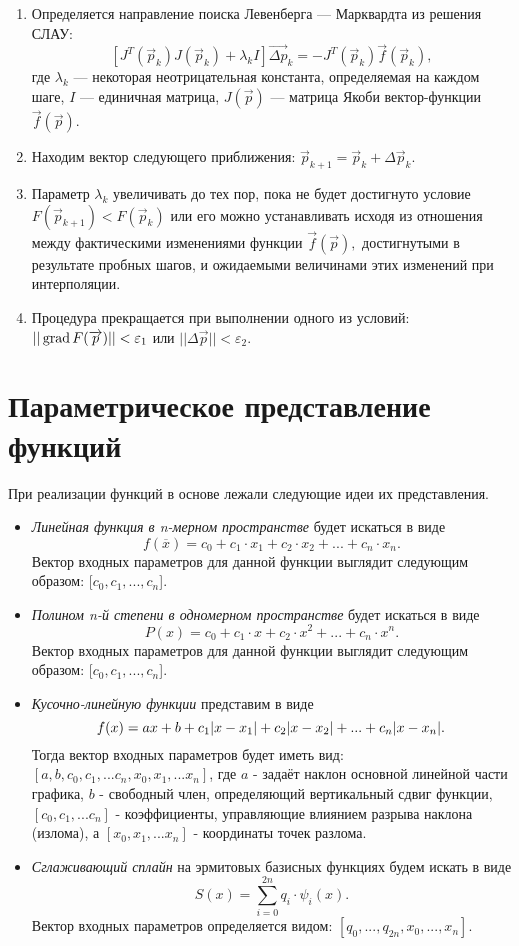 \begin{enumerate}
	\item Определяется направление поиска Левенберга — Марквардта  из решения СЛАУ: 
	$$[J^{T}({\vec {p}}_{k})J({\vec {p}}_{k})+\lambda _{k}I]{\vec {\Delta p}}_{k}=-J^{T}({\vec {p}}_{k}){\vec {f}}({\vec {p}}_{k}),$$
	где $\lambda _{k}$ — некоторая неотрицательная константа, определяемая на каждом шаге, $I$ — единичная матрица, $J({\vec {p}})$ — матрица Якоби вектор-функции ${\vec {f}}({\vec {p}})$. 
	\item Находим вектор следующего приближения: $\vec {p}_{k+1}={\vec {p}}_{k}+{\Delta \vec {p}}_{k}.$
	\item Параметр $\lambda _{k}$  увеличивать до тех пор, пока не будет достигнуто условие $F({\vec {p}}_{k+1})<F({\vec {p}}_{k})$ или его можно устанавливать исходя из отношения между фактическими изменениями функции ${\vec {f}}({\vec {p}}),$ достигнутыми в результате пробных шагов, и ожидаемыми величинами этих изменений при интерполяции.
	\item Процедура прекращается при выполнении одного из условий: $|| \, \mathrm{grad} \, F(\overrightarrow{p})|| < \varepsilon_1$ или $|| \Delta \overrightarrow{p}|| < \varepsilon_2$.
\end{enumerate}



\section{Параметрическое представление функций}

При реализации функций в основе лежали следующие идеи их представления.

\begin{itemize}
	\item \textsl{Линейная функция в n-мерном пространстве} будет искаться в виде $$f(\overline{x}) = c_0 + c_1 \cdot x_1 + c_2 \cdot x_2 + ... + c_n \cdot x_n.$$ Вектор входных параметров для данной функции	выглядит следующим образом: [$c_0, c_1, ..., c_n$].
	\item \textsl{Полином n-й степени в одномерном пространстве} будет искаться в виде $$P(x) = c_0 + c_1 \cdot x + c_2 \cdot x^2 + ... + c_n \cdot x^n.$$ Вектор входных параметров для данной функции выглядит следующим образом: [$c_0, c_1, ..., c_n$].
	\item \textsl{Кусочно-линейную функции} представим в виде $$f(x) = ax + b + c_1 \abs{x - x_1} + c_2 \abs{x - x_2} + ... + c_n \abs{x - x_n}.$$ Тогда вектор входных параметров будет иметь вид: $[a, b, c_0, c_1, ... c_n, x_0, x_1, ... x_n]$, где $a$ - задаёт наклон основной линейной части графика, $b$ - свободный член, определяющий вертикальный сдвиг функции, $[c_0, c_1, ... c_n]$ - коэффициенты, управляющие влиянием разрыва наклона (излома), а $[x_0, x_1, ... x_n]$ - координаты точек разлома.
	\item \textsl{Сглаживающий сплайн} на эрмитовых базисных функциях будем искать в виде $$S(x) = \sum_{i = 0}^{2n} q_i \cdot \psi_i(x).$$ Вектор входных параметров определяется видом: $[q_0, ..., q_{2n}, x_0, ..., x_n]$.
\end{itemize}